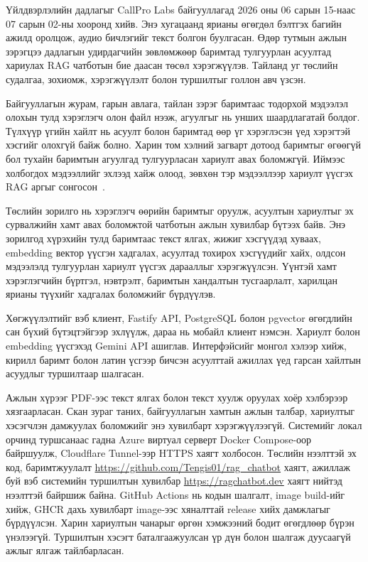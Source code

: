 \documentclass[../main.tex]{subfiles}
\begin{document}
Үйлдвэрлэлийн дадлагыг CallPro Labs байгууллагад 2026 оны 06 сарын
15-наас 07 сарын 02-ны хооронд хийв. Энэ хугацаанд ярианы өгөгдөл
бэлтгэх багийн ажилд оролцож, аудио бичлэгийг текст болгон буулгасан.
Өдөр тутмын ажлын зэрэгцээ дадлагын удирдагчийн зөвлөмжөөр баримтад
тулгуурлан асуултад хариулах RAG чатботын бие даасан төсөл хэрэгжүүлэв.
Тайланд уг төслийн судалгаа, зохиомж, хэрэгжүүлэлт болон туршилтыг
голлон авч үзсэн.

Байгууллагын журам, гарын авлага, тайлан зэрэг баримтаас тодорхой
мэдээлэл олохын тулд хэрэглэгч олон файл нээж, агуулгыг нь унших
шаардлагатай болдог. Түлхүүр үгийн хайлт нь асуулт болон баримтад
өөр үг хэрэглэсэн үед хэрэгтэй хэсгийг олохгүй байж болно. Харин
том хэлний загварт дотоод баримтыг өгөөгүй бол тухайн баримтын
агуулгад тулгуурласан хариулт авах боломжгүй. Иймээс холбогдох
мэдээллийг эхлээд хайж олоод, зөвхөн тэр мэдээллээр хариулт үүсгэх
RAG аргыг сонгосон~\cite{lewis2020rag}.

Төслийн зорилго нь хэрэглэгч өөрийн баримтыг оруулж, асуултын хариултыг
эх сурвалжийн хамт авах боломжтой чатботын ажлын хувилбар бүтээх байв.
Энэ зорилгод хүрэхийн тулд баримтаас текст ялгах, жижиг хэсгүүдэд хуваах,
embedding вектор үүсгэн хадгалах, асуултад тохирох хэсгүүдийг хайх,
олдсон мэдээлэлд тулгуурлан хариулт үүсгэх дарааллыг хэрэгжүүлсэн.
Үүнтэй хамт хэрэглэгчийн бүртгэл, нэвтрэлт, баримтын хандалтын
тусгаарлалт, харилцан ярианы түүхийг хадгалах боломжийг бүрдүүлэв.

Хөгжүүлэлтийг вэб клиент, Fastify API, PostgreSQL болон pgvector
өгөгдлийн сан бүхий бүтэцтэйгээр эхлүүлж, дараа нь мобайл клиент нэмсэн.
Хариулт болон embedding үүсгэхэд Gemini API ашиглав. Интерфэйсийг
монгол хэлээр хийж, кирилл баримт болон латин үсгээр бичсэн асуулттай
ажиллах үед гарсан хайлтын асуудлыг туршилтаар шалгасан.

Ажлын хүрээг PDF-ээс текст ялгах болон текст хуулж оруулах хоёр хэлбэрээр
хязгаарласан. Скан зураг таних, байгууллагын хамтын ажлын талбар,
хариултыг хэсэгчлэн дамжуулах боломжийг энэ хувилбарт хэрэгжүүлээгүй.
Системийг локал орчинд туршсанаас гадна Azure виртуал серверт Docker
Compose-оор байршуулж, Cloudflare Tunnel-ээр HTTPS хаягт холбосон.
Төслийн нээлттэй эх код, баримтжуулалт \url{https://github.com/Tengis01/rag_chatbot}
хаягт, ажиллаж буй вэб системийн туршилтын хувилбар \url{https://ragchatbot.dev}
хаягт нийтэд нээлттэй байршиж байна. GitHub Actions нь кодын шалгалт,
image build-ийг хийж, GHCR дахь хувилбарт image-ээс хяналттай release хийх
дамжлагыг бүрдүүлсэн. Харин хариултын чанарыг өргөн хэмжээний бодит
өгөгдлөөр бүрэн үнэлээгүй. Туршилтын хэсэгт баталгаажуулсан үр дүн болон
шалгаж дуусаагүй ажлыг ялгаж тайлбарласан.
\end{document}
